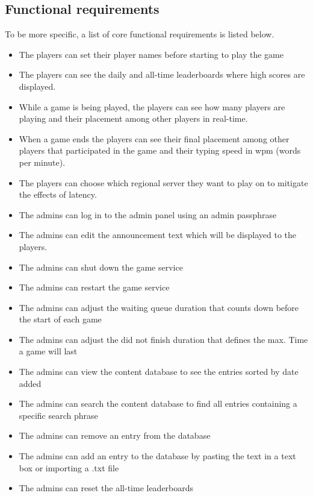 \documentclass[titlepage]{article}
\begin{document}
\subsection{Functional requirements}

To be more specific, a list of core functional requirements is listed below.

\begin{itemize}
	\item The players can set their player names before starting to play the game
	\item The players can see the daily and all-time leaderboards where high scores are displayed.
	\item While a game is being played, the players can see how many players are playing and their placement among other players in real-time.
	\item When a game ends the players can see their final placement among other players that participated in the game and their typing speed in wpm (words per minute).
	\item The players can choose which regional server they want to play on to mitigate the effects of latency.
	\item The admins can log in to the admin panel using an admin passphrase
	\item The admins can edit the announcement text which will be displayed to the players.
	\item The admins can shut down the game service
	\item The admins can restart the game service
	\item The admins can adjust the waiting queue duration that counts down before the start of each game
	\item The admins can adjust the did not finish duration that defines the max. Time a game will last
	\item The admins can view the content database to see the entries sorted by date added
	\item The admins can search the content database to find all entries containing a specific search phrase
	\item The admins can remove an entry from the database
	\item The admins can add an entry to the database by pasting the text in a text box or importing a .txt file
	\item The admins can reset the all-time leaderboards
\end{itemize}
\end{document}
